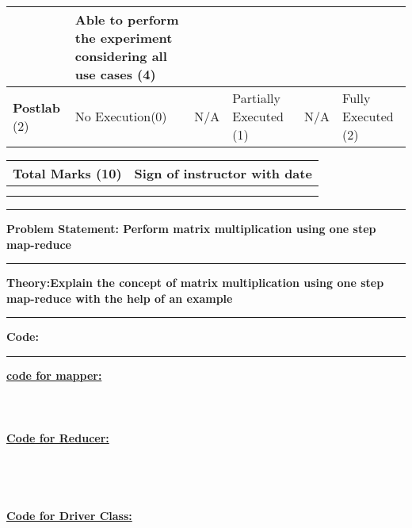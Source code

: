 \documentclass[11pt,article]{memoir}
\begin{document}
\begin{flushleft}
\begin{tabular}{|p{2cm}|p{2cm}|p{2cm}|p{2cm}|p{2cm}|p{2cm}|}
                   & Able to
                   perform the
                   experiment
                   considering
                   all use cases
                   (4) \\ 
                  \hline \textbf{Postlab} (2) & No Execution(0) & N/A & Partially Executed (1) & N/A & Fully Executed (2) \\ 
                  \hline 
                  \end{tabular}
        \begin{table}[H]
        \centering
        \begin{tabular}{|c|c|}
                \hline \textbf{Total Marks (10)} & \textbf{Sign of instructor with date} \\ 
                \hline  &  \\ & \\
                \hline 
                \end{tabular} 
        \end{table}
        
    \pagebreak


\maketitle

\hrule \vspace{0.2cm}
\textbf{Problem Statement: Perform matrix multiplication using one step map-reduce}\hrule\vspace{0.2cm}
\textbf{Theory:Explain the concept of matrix multiplication using one step map-reduce with the help of an example}\hrule\vspace{0.2cm}
\afterpage{\newpage~\newpage}\newpage
\textbf{Code:}\hrule
\vspace{0.5cm}
\textbf{\underline{code for mapper:}}

\begin{lstlisting}[language=java]

	
\end{lstlisting}
\textbf{\underline{Code for Reducer:}}
\begin{lstlisting}[language=java]





\end{lstlisting}
\textbf{\underline{Code for Driver Class:}}
\begin{lstlisting}[language=java]






\end{lstlisting}
\end{flushleft}
\end{document}
